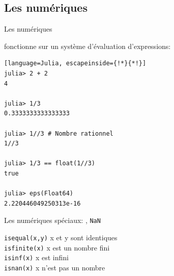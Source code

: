 \subsection{Les numériques}
\begin{frame}[containsverbatim]{Les numériques}
\par{{\Julia} fonctionne sur un système d'évaluation d'expressions:}
\begin{lstlisting}[language=Julia, escapeinside={!*}{*!}]
julia> 2 + 2
4

julia> 1/3
0.3333333333333333

julia> 1//3 # Nombre rationnel
1//3

julia> 1/3 == float(1//3)
true

julia> eps(Float64)
2.220446049250313e-16
\end{lstlisting}
\vspace{2ex}
\par{Les numériques spéciaux: , \texttt{NaN}}
\vspace{-2ex}
\begin{multicols}{2}
    {\small
         \texttt{isequal(x,y)} x et y sont identiques\\
         \texttt{isfinite(x)} x est un nombre fini\\
        \columnbreak
         \texttt{isinf(x)} x est infini\\
         \texttt{isnan(x)} x n'est pas un nombre\\
    }
\end{multicols}\vspace{-1ex}
\end{frame}


